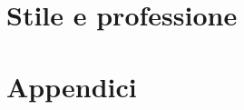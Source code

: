 \documentclass[a4paper,11pt,oneside]{book}
\begin{document}



\part{Stile e professione}



\appendix
\part*{Appendici}



\end{document}
